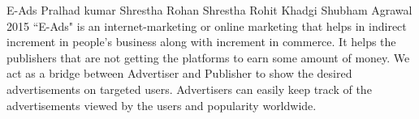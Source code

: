  \begin{conf-abstract}[]
{E-Ads}
{
Pralhad kumar Shrestha
Rohan Shrestha
Rohit Khadgi
Shubham Agrawal
}
{2015}
``E-Ads" is an internet-marketing or online marketing that helps in indirect increment in people's business along with increment in commerce. It helps the publishers that are not getting the platforms to earn some amount of money. We act as a bridge between Advertiser and Publisher to show the desired advertisements on targeted users. Advertisers can easily keep track of the advertisements viewed by the users and popularity worldwide.
  \end{conf-abstract}